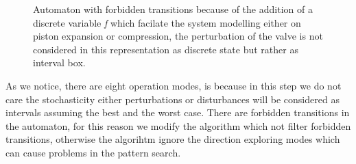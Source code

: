       \begin{figure}[!hbt]
        \centering
        
        \captionsetup{format=hang}
        \caption{Automaton with forbidden transitions because of the addition of a 
        discrete variable \emph{f} which facilate the system modelling either on
        piston expansion or compression, the perturbation of the valve is not considered
        in this representation as discrete state but rather as interval box.}
        \label{fig:automaton}
      \end{figure}
      As we notice, there are eight operation modes, is because in this step
      we do not care the stochasticity  either perturbations or disturbances 
      will be considered as intervals assuming the best and the worst case.
      There are forbidden transitions in the automaton, for this reason we 
      modify the algorithm which not filter forbidden transitions, otherwise
      the algorihtm ignore the direction exploring modes which can cause problems
      in the pattern search.
      \clearpage 
      \
      \
